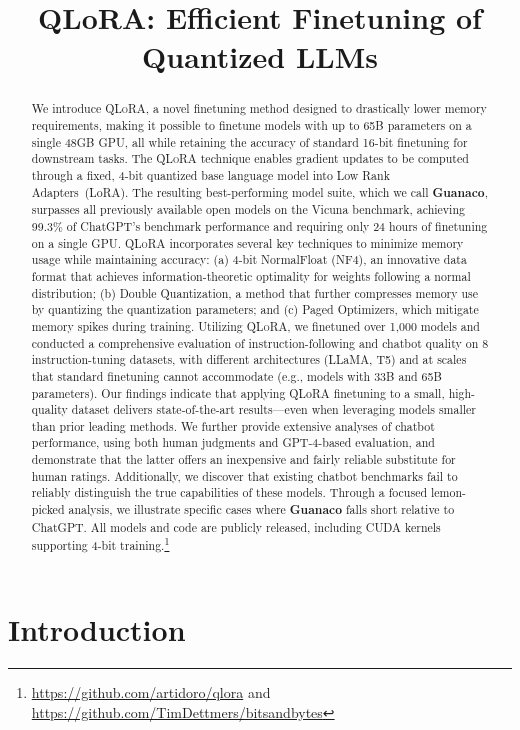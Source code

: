 \title{QLoRA: Efficient Finetuning of Quantized LLMs}

\begin{abstract}
We introduce \textsc{QLoRA}, a novel finetuning method designed to drastically lower memory requirements, making it possible to finetune models with up to 65B parameters on a single 48GB GPU, all while retaining the accuracy of standard 16-bit finetuning for downstream tasks. The \textsc{QLoRA} technique enables gradient updates to be computed through a fixed, 4-bit quantized base language model into Low Rank Adapters~(LoRA). The resulting best-performing model suite, which we call \textbf{Guanaco}, surpasses all previously available open models on the Vicuna benchmark, achieving 99.3\% of ChatGPT’s benchmark performance and requiring only 24 hours of finetuning on a single GPU. \textsc{QLoRA} incorporates several key techniques to minimize memory usage while maintaining accuracy: (a) 4-bit NormalFloat (NF4), an innovative data format that achieves information-theoretic optimality for weights following a normal distribution; (b) Double Quantization, a method that further compresses memory use by quantizing the quantization parameters; and (c) Paged Optimizers, which mitigate memory spikes during training. Utilizing \textsc{QLoRA}, we finetuned over 1,000 models and conducted a comprehensive evaluation of instruction-following and chatbot quality on 8 instruction-tuning datasets, with different architectures (LLaMA, T5) and at scales that standard finetuning cannot accommodate (e.g., models with 33B and 65B parameters). Our findings indicate that applying QLoRA finetuning to a small, high-quality dataset delivers state-of-the-art results—even when leveraging models smaller than prior leading methods. We further provide extensive analyses of chatbot performance, using both human judgments and GPT-4-based evaluation, and demonstrate that the latter offers an inexpensive and fairly reliable substitute for human ratings. Additionally, we discover that existing chatbot benchmarks fail to reliably distinguish the true capabilities of these models. Through a focused lemon-picked analysis, we illustrate specific cases where \textbf{Guanaco} falls short relative to ChatGPT. All models and code are publicly released, including CUDA kernels supporting 4-bit training.\footnote{\url{https://github.com/artidoro/qlora} and \url{https://github.com/TimDettmers/bitsandbytes}}
\end{abstract}

\section{Introduction}

